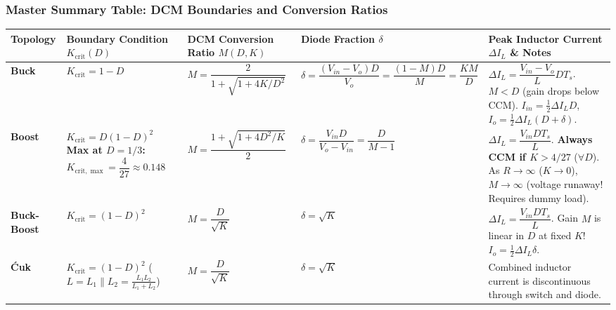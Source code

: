 \vspace{-6pt}
\subsubsection*{Master Summary Table: DCM Boundaries and Conversion Ratios}
\vspace{-4pt}
\begin{center}
\vspace{-6pt}
\footnotesize
\renewcommand{\arraystretch}{1.20}
\begin{tabularx}{\textwidth}{@{} >{\raggedright\arraybackslash}p{2.0cm} >{\raggedright\arraybackslash}p{2.8cm} >{\raggedright\arraybackslash}p{3.3cm} >{\raggedright\arraybackslash}p{2.5cm} >{\raggedright\arraybackslash}X @{}}
\toprule
\textbf{Topology} & \textbf{Boundary Condition $K_{\mathrm{crit}}(D)$} & \textbf{DCM Conversion Ratio $M(D, K)$} & \textbf{Diode Fraction $\delta$} & \textbf{Peak Inductor Current $\Delta I_L$ \& Notes} \\
\midrule
\textbf{Buck} &
$K_{\mathrm{crit}} = 1 - D$ &
$M = \dfrac{2}{1 + \sqrt{1 + 4K/D^2}}$ &
$\delta = \dfrac{(V_{in} - V_o)D}{V_o} = \dfrac{(1-M)D}{M} = \dfrac{KM}{D}$ &
$\Delta I_L = \dfrac{V_{in}-V_o}{L} D T_s$. \newline
$M < D$ (gain drops below CCM). $I_{in} = \tfrac{1}{2} \Delta I_L D$, $I_o = \tfrac{1}{2} \Delta I_L (D+\delta)$. \\

\textbf{Boost} &
$K_{\mathrm{crit}} = D(1-D)^2$ \newline
\textbf{Max at $D = 1/3$:} \newline
$K_{\mathrm{crit},\max} = \dfrac{4}{27} \approx 0.148$ &
$M = \dfrac{1 + \sqrt{1 + 4D^2/K}}{2}$ &
$\delta = \dfrac{V_{in} D}{V_o - V_{in}} = \dfrac{D}{M-1}$ &
$\Delta I_L = \dfrac{V_{in} D T_s}{L}$. \newline
\textbf{Always CCM if $K > 4/27$} ($\forall D$). \newline
As $R \to \infty$ ($K \to 0$), $M \to \infty$ (voltage runaway! Requires dummy load). \\

\textbf{Buck-Boost} &
$K_{\mathrm{crit}} = (1-D)^2$ &
$M = \dfrac{D}{\sqrt{K}}$ &
$\delta = \sqrt{K}$ &
$\Delta I_L = \dfrac{V_{in} D T_s}{L}$. \newline
Gain $M$ is linear in $D$ at fixed $K$! $I_o = \tfrac{1}{2} \Delta I_L \delta$. \\

\textbf{\'{C}uk} &
$K_{\mathrm{crit}} = (1-D)^2$ \newline
($L = L_1 \parallel L_2 = \frac{L_1 L_2}{L_1 + L_2}$) &
$M = \dfrac{D}{\sqrt{K}}$ &
$\delta = \sqrt{K}$ &
Combined inductor current is discontinuous through switch and diode. \\
\bottomrule
\end{tabularx}
\end{center}

